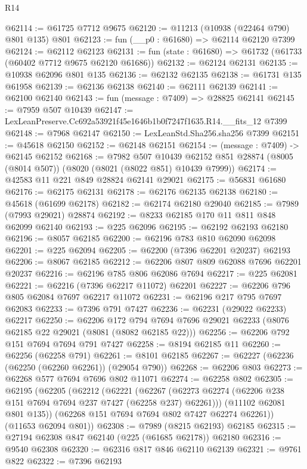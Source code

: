 \begin{lexlean}{R14}
\begin{coremodule}
@62114 := @61725 @7712 @9675
@62120 := @11213 (@10938 (@22464 @790) @801 @135) @801
@62123 := fun (__p0 : @61680) => @62114 @62120 @7399
@62124 := @62112 @62123
@62131 := fun (state : @61680) => @61732 (@61733 (@60402 @7712 @9675 @62120 @61686))
@62132 := @62124 @62131
@62135 := @10938 @62096 @801 @135
@62136 := @62132 @62135
@62138 := @61731 @135 @61958
@62139 := @62136 @62138
@62140 := @62111 @62139
@62141 := @62100 @62140
@62143 := fun (message : @7409) => @28825 @62141
@62145 := @7959 @507 @10439
@62147 := LexLeanPreserve.Cc692a53921f45e1646b1b0f7247f1635.R14.__fits_12 @7399
@62148 := @7968 @62147
@62150 := LexLeanStd.Sha256.sha256 @7399
@62151 := @45618 @62150
@62152 := @62148 @62151
@62154 := (message : @7409) -> @62145 @62152
@62168 := @7982
    @507
    @10439
    @62152
    @851
    @28874
    (@8005 (@8014 @507))
    (@8020 (@8021 (@8022 @851) @10439 @7999))
@62174 := @42583 @11 @221 @849 @28824 @62141 @29021
@62175 := @56831 @61680
@62176 := @62175 @62131
@62178 := @62176 @62135 @62138
@62180 := @45618 (@61699 @62178)
@62182 := @62174 @62180 @29040
@62185 := @7989 (@7993 @29021) @28874
@62192 := @8233 @62185 @170 @11 @811 @848 @62099 @62140
@62193 := @225 @62096
@62195 := @62192 @62193 @62180
@62196 := @8057 @62185
@62200 := @62196 @783 @810 @62090 @62098
@62201 := @225 @62094
@62205 := @62200 (@7396 @62201 @20237) @62193
@62206 := @8067 @62185
@62212 := @62206 @807 @809 @62088 @7696 @62201 @20237
@62216 := @62196 @785 @806 @62086 @7694
@62217 := @225 @62081
@62221 := @62216 (@7396 @62217 @11072) @62201
@62227 := @62206 @796 @805 @62084 @7697 @62217 @11072
@62231 := @62196 @217 @795 @7697 @62083
@62233 := @7396 @791 @7427
@62236 := @62231 (@29022 @62233) @62217
@62250 := @62206
    @172
    @794
    @7694
    @7696
    @29021
    @62233
    (@8076 @62185 @22 @29021 (@8081 (@8082 @62185 @22)))
@62256 := @62206 @792 @151 @7694 @7694 @791 @7427
@62258 := @8194 @62185 @11
@62260 := @62256 (@62258 @791)
@62261 := @8101 @62185
@62267 := @62227 (@62236 (@62250 (@62260 @62261)) (@29054 @790))
@62268 := @62206 @803
@62273 := @62268 @577 @7694 @7696 @802 @11071
@62274 := @62258 @802
@62305 := @62195
    (@62205
      (@62212
        (@62221
          (@62267 (@62273 @62274 (@62206 @238 @151 @7694 @7694 @237 @7427 (@62258 @237) @62261)))
          (@11102 @62081 @801 @135))
        (@62268 @151 @7694 @7694 @802 @7427 @62274 @62261))
      (@11653 @62094 @801))
@62308 := @7989 (@8215 @62193) @62185
@62315 := @27194 @62308 @847 @62140 (@225 (@61685 @62178)) @62180
@62316 := @9540 @62308
@62320 := @62316 @817 @846 @62110 @62139
@62321 := @9761 @822
@62322 := @7396 @62193

\end{coremodule}
\end{lexlean}
